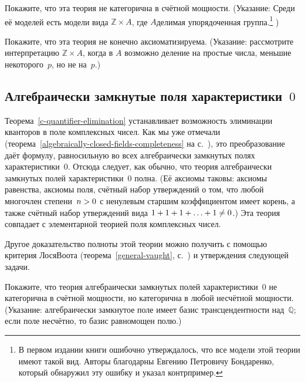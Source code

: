 \begin{problem}
Покажите, что эта теория не категорична в счётной мощности.
(Указание: Среди её моделей есть модели вида
$\mathbb{Z}\times A$, где $A$\т делимая упорядоченная группа.\footnote{%
        В первом издании книги ошибочно утверждалось, что все модели
        этой теории имеют такой вид. Авторы благодарны Евгению Петровичу
        Бондаренко, который обнаружил эту ошибку и указал контрпример.}%
)
\end{problem}

\begin{problem}
Покажите, что эта теория не конечно аксиоматизируема. (Указание:
рассмотрите интерпретацию $\mathbb{Z}\times A$, когда в $A$
возможно деление на простые числа, меньшие некоторого~$p$, но не
на~$p$.)
\end{problem}

\subsection*{Алгебраически замкнутые поля характеристики~$0$}

Теорема~\ref{c-quantifier-elimination} устанавливает
возможность элиминации кванторов в поле комплексных чисел. Как
мы уже отмечали
(теорема~\ref{algebraically-closed-fields-completeness} на
с.~\pageref{algebraically-closed-fields-completeness}), это
преобразование даёт формулу, равносильную во всех алгебраически
замкнутых полях характеристики~$0$. Отсюда следует, как обычно, что
теория алгебраически замкнутых полей характеристики~$0$ полна.
(Её аксиомы таковы: аксиомы равенства, аксиомы
поля, счётный набор утверждений о
том, что любой многочлен степени~$n\hm>0$ с ненулевым старшим
коэффициентом имеет корень, а также счётный набор утверждений
вида $1\hm+1\hm+1+\ldots+1\ne 0$.) Эта теория совпадает с
элементарной теорией поля комплексных чисел.

Другое доказательство полноты этой теории можно получить с
помощью критерия Лося\ч Воота (теорема~\ref{general-vaught},
с.~\pageref{general-vaught})
и утверждения
следующей задачи.

\begin{problem}
Покажите, что теория алгебраически замкнутых полей
характеристики~$0$ не категорична в счётной мощности, но
категорична в любой несчётной мощности. (Указание: алгебраически
замкнутое поле имеет базис трансцендентности над~$\mathbb{Q}$; если
поле несчётно, то базис равномощен полю.)
\end{problem}

